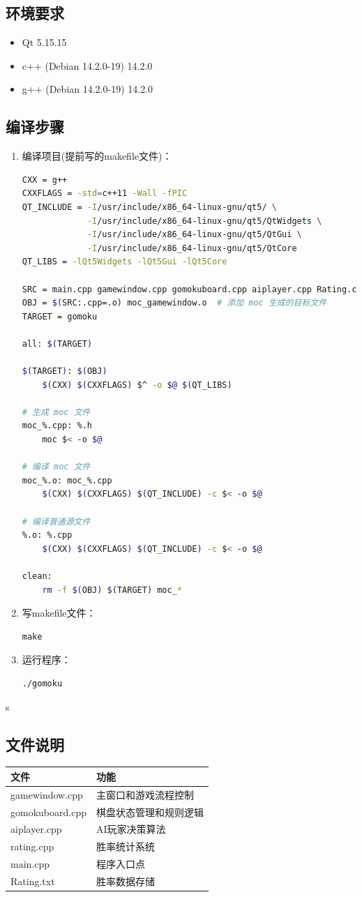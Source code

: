 \documentclass[UTF8]{ctexart}
\begin{document}
\subsection{环境要求}
\begin{itemize}
    \item Qt 5.15.15
    \item c++ (Debian 14.2.0-19) 14.2.0
    \item g++ (Debian 14.2.0-19) 14.2.0
\end{itemize}

\subsection{编译步骤}
\begin{enumerate}
    \item 编译项目(提前写的makefile文件)：
\begin{lstlisting}[language=bash]
CXX = g++
CXXFLAGS = -std=c++11 -Wall -fPIC
QT_INCLUDE = -I/usr/include/x86_64-linux-gnu/qt5/ \
             -I/usr/include/x86_64-linux-gnu/qt5/QtWidgets \
             -I/usr/include/x86_64-linux-gnu/qt5/QtGui \
             -I/usr/include/x86_64-linux-gnu/qt5/QtCore
QT_LIBS = -lQt5Widgets -lQt5Gui -lQt5Core

SRC = main.cpp gamewindow.cpp gomokuboard.cpp aiplayer.cpp Rating.cpp
OBJ = $(SRC:.cpp=.o) moc_gamewindow.o  # 添加 moc 生成的目标文件
TARGET = gomoku

all: $(TARGET)

$(TARGET): $(OBJ)
	$(CXX) $(CXXFLAGS) $^ -o $@ $(QT_LIBS)

# 生成 moc 文件
moc_%.cpp: %.h
	moc $< -o $@

# 编译 moc 文件
moc_%.o: moc_%.cpp
	$(CXX) $(CXXFLAGS) $(QT_INCLUDE) -c $< -o $@

# 编译普通源文件
%.o: %.cpp
	$(CXX) $(CXXFLAGS) $(QT_INCLUDE) -c $< -o $@

clean:
	rm -f $(OBJ) $(TARGET) moc_*
\end{lstlisting}
\item 写makefile文件：
\begin{lstlisting}[language=make]
make
\end{lstlisting}
    \item 运行程序：
\begin{lstlisting}[language=bash]
./gomoku
\end{lstlisting}
\end{enumerate}s

\subsection{文件说明}
\begin{tabular}{|l|l|}
\hline
\textbf{文件} & \textbf{功能} \\
\hline
gamewindow.cpp & 主窗口和游戏流程控制 \\
gomokuboard.cpp & 棋盘状态管理和规则逻辑 \\
aiplayer.cpp & AI玩家决策算法 \\
rating.cpp & 胜率统计系统 \\
main.cpp & 程序入口点 \\
Rating.txt & 胜率数据存储 \\
\hline
\end{tabular}
\end{document}
